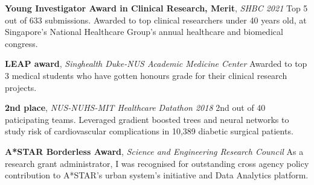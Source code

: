 \documentclass[letterpaper,10pt,oneside]{article}
\begin{document}
\begin{body}
\textbf{Young Investigator Award in Clinical Research, Merit}, \textit{SHBC 2021}
\hfill{}
\GapNoBreak
\BulletItem
Top 5 out of 633 submissions. Awarded to top clinical researchers under 40 years old, at Singapore's National Healthcare Group's annual healthcare and biomedical congress. 
\GapNoBreak
\medskip

\textbf{LEAP award}, \textit{Singhealth Duke-NUS Academic Medicine Center}
\hfill{}
\GapNoBreak
\BulletItem
Awarded to top 3 medical students who have gotten honours grade for their clinical research projects. 
\GapNoBreak
\medskip

\textbf{2nd place}, \textit{NUS-NUHS-MIT Healthcare Datathon 2018}
\hfill{}
\GapNoBreak
\BulletItem
2nd out of 40 paticipating teams. Leveraged gradient boosted trees and neural networks to study risk of cardiovascular complications in 10,389 diabetic surgical patients.
\GapNoBreak
\medskip





\textbf{A*STAR Borderless Award}, \textit{Science and Engineering Research Council}
\hfill
{}
\BulletItem
As a research grant administrator, I was recognised for outstanding cross agency policy contribution to A*STAR's urban system's initiative and Data Analytics platform.
\GapNoBreak
\medskip


\end{body}
\end{document}
